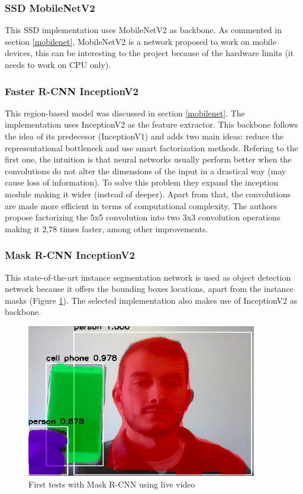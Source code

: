 \subsubsection{SSD MobileNetV2}
This SSD implementation uses MobileNetV2 as backbone. As commented in section \ref{mobilenet}, MobileNetV2 is a network proposed to work on mobile devices, this can be interesting to the project because of the hardware limits (it needs to work on CPU only).
\subsubsection{Faster R-CNN InceptionV2}
This region-based model was discussed in section \ref{mobilenet}. The implementation uses InceptionV2 \cite{szegedy2016rethinking} as the feature extractor. This backbone follows the idea of its predecesor (InceptionV1) and adds two main ideas: reduce the representational bottleneck and use smart factorization methods. Refering to the first one, the intuition is that neural networks usually perform better when the convolutions do not alter the dimensions of the input in a drastical way (may cause loss of information). To solve this problem they expand the inception module making it wider (instead of deeper). Apart from that, the convolutions are made more efficient in terms of computational complexity. The authors propose factorizing the 5x5 convolution into two 3x3 convolution operations making it 2,78 times faster, among other improvements.
\subsubsection{Mask R-CNN InceptionV2}
This state-of-the-art instance segmentation network is used as object detection network because it offers the bounding boxes locations, apart from the instance masks (Figure \ref{fig:maskrcnn_tests}). The selected implementation also makes use of InceptionV2 as backbone.
\begin{figure}[H]
\begin{center}
\includegraphics[scale=0.5]{figures/maskrcnn_first_tests.png}
\caption{First tests with Mask R-CNN using live video}
\label{fig:maskrcnn_tests}
\end{center}
\end{figure} 
